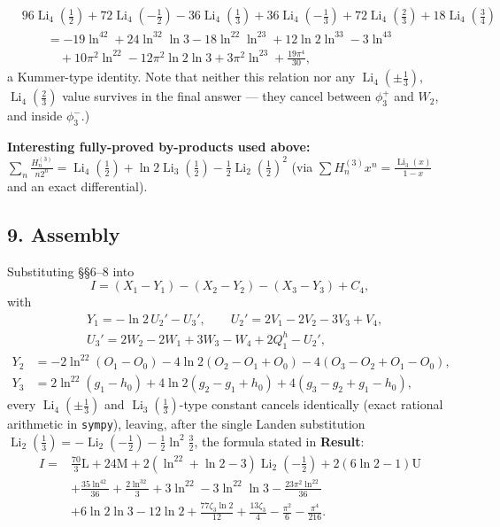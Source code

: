 \documentclass[11pt]{article}
\theoremstyle{remark}
\begin{document}
\[
\begin{aligned}
&96\operatorname{Li}_4(\tfrac12)+72\operatorname{Li}_4(-\tfrac12)-36\operatorname{Li}_4(\tfrac13)+36\operatorname{Li}_4(-\tfrac13)+72\operatorname{Li}_4(\tfrac23)+18\operatorname{Li}_4(\tfrac34)\\
&\qquad=-19\ln^42+24\ln^32\ln3-18\ln^22\ln^23+12\ln2\ln^33-3\ln^43\\
&\qquad\quad+10\pi^2\ln^22-12\pi^2\ln2\ln3+3\pi^2\ln^23+\frac{19\pi^4}{30},
\end{aligned}
\]
a Kummer-type identity. Note that neither this relation nor any $\operatorname{Li}_4(\pm\tfrac13)$, $\operatorname{Li}_4(\tfrac23)$ value survives in the final answer --- they cancel between $\phi_3^{+}$ and $W_2$, and inside $\phi_3^-$.)

\textbf{Interesting fully-proved by-products used above:} $\sum_{n}\frac{H_n^{(3)}}{n2^n}=\operatorname{Li}_4(\tfrac12)+\ln2\operatorname{Li}_3(\tfrac12)-\tfrac12\operatorname{Li}_2(\tfrac12)^2$ (via $\sum H^{(3)}_nx^n=\frac{\operatorname{Li}_3(x)}{1-x}$ and an exact differential).

\subsection*{9. Assembly}

Substituting \S\S6--8 into
\[
I=(X_1-Y_1)-(X_2-Y_2)-(X_3-Y_3)+C_4,
\]
with
\[
\begin{aligned}
&Y_1=-\ln2\,U_2'-U_3',\qquad U_2'=2V_1-2V_2-3V_3+V_4,\\
&U_3'=2W_2-2W_1+3W_3-W_4+2Q_1^{h}-U_2',
\end{aligned}
\]
\[
\begin{aligned}
Y_2&=-2\ln^22(O_1-O_0)-4\ln2(O_2-O_1+O_0)-4(O_3-O_2+O_1-O_0),\\
Y_3&=2\ln^22(g_1-h_0)+4\ln2(g_2-g_1+h_0)+4(g_3-g_2+g_1-h_0),
\end{aligned}
\]
every $\operatorname{Li}_4(\pm\tfrac13)$ and $\operatorname{Li}_3(\tfrac13)$-type constant cancels identically (exact rational arithmetic in \texttt{sympy}), leaving, after the single Landen substitution $\operatorname{Li}_2(\tfrac13)=-\operatorname{Li}_2(-\tfrac12)-\tfrac12\ln^2\tfrac32$, the formula stated in \textbf{Result}:
\[
\begin{aligned}
I={}&\frac{70}{3}\mathrm{L}+24\mathrm{M}+2(\ln^22+\ln2-3)\operatorname{Li}_2(-\tfrac12)+2(6\ln2-1)\mathrm{U}\\
&+\frac{35\ln^42}{36}+\frac{2\ln^32}{3}+3\ln^22-3\ln^22\ln3-\frac{23\pi^2\ln^22}{36}\\
&+6\ln2\ln3-12\ln2+\frac{77\zeta_3\ln2}{12}+\frac{13\zeta_3}{4}-\frac{\pi^2}{6}-\frac{\pi^4}{216}.
\end{aligned}
\]
\end{document}
